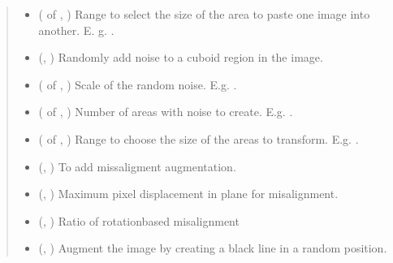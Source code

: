 \documentclass[letterpaper,10pt,english]{sphinxmanual}
\begin{document}
\begin{fulllineitems}
\begin{quote}
\begin{description}
\begin{itemize}
\item {} 
 ( of , ) \textendash{} Range to select the size of the area to paste one image into another. E. g. .

\item {} 
 (, ) \textendash{} Randomly add noise to a cuboid region in the image.

\item {} 
 ( of , ) \textendash{} Scale of the random noise. E.g. .

\item {} 
 ( of , ) \textendash{} Number of areas with noise to create. E.g. .

\item {} 
 ( of , ) \textendash{} Range to choose the size of the areas to transform. E.g. .

\item {} 
 (, ) \textendash{} To add miss\sphinxhyphen{}aligment augmentation.

\item {} 
 (, ) \textendash{} Maximum pixel displacement in \sphinxhyphen{}plane for misalignment.

\item {} 
 (, ) \textendash{} Ratio of rotation\sphinxhyphen{}based mis\sphinxhyphen{}alignment

\item {} 
 (, ) \textendash{} Augment the image by creating a black line in a random position.


\end{itemize}
\end{description}
\end{quote}
\end{fulllineitems}
\end{document}
